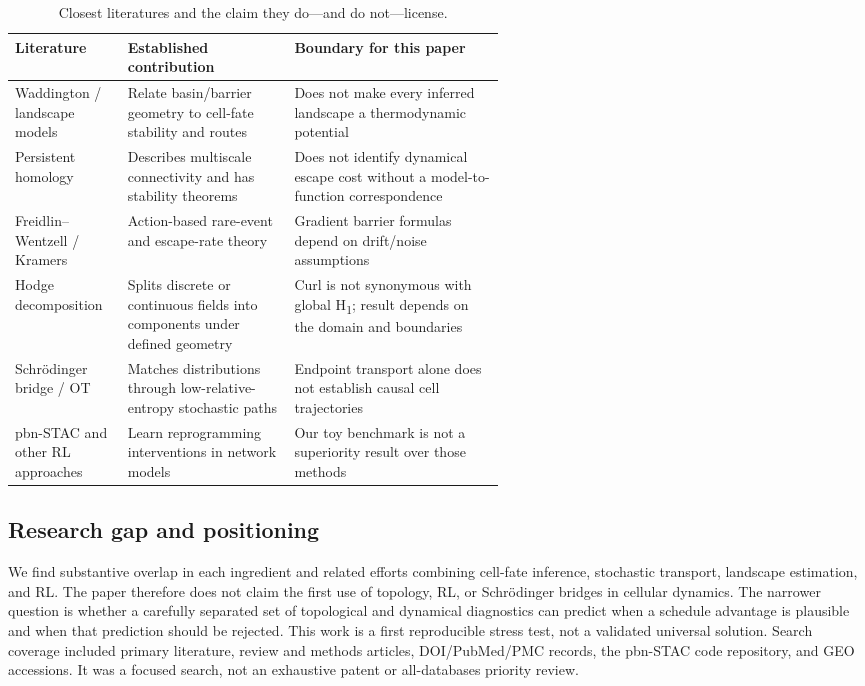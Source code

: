 \documentclass[11pt]{article}
\newcommand{\1}{\mathbf{1}}
\begin{document}
\begin{table}[tbp]\centering\small
\caption{Closest literatures and the claim they do—and do not—license.}
\label{tab:related}
\begin{tabularx}{\linewidth}{@{}p{0.23\linewidth}p{0.34\linewidth}X@{}}\toprule
Literature & Established contribution & Boundary for this paper \\\midrule
Waddington / landscape models & Relate basin/barrier geometry to cell-fate stability and routes & Does not make every inferred landscape a thermodynamic potential \\
Persistent homology & Describes multiscale connectivity and has stability theorems & Does not identify dynamical escape cost without a model-to-function correspondence \\
Freidlin--Wentzell / Kramers & Action-based rare-event and escape-rate theory & Gradient barrier formulas depend on drift/noise assumptions \\
Hodge decomposition & Splits discrete or continuous fields into components under defined geometry & Curl is not synonymous with global H\textsubscript{1}; result depends on the domain and boundaries \\
Schrödinger bridge / OT & Matches distributions through low-relative-entropy stochastic paths & Endpoint transport alone does not establish causal cell trajectories \\
pbn-STAC and other RL approaches & Learn reprogramming interventions in network models & Our toy benchmark is not a superiority result over those methods \\
\bottomrule\end{tabularx}
\end{table}

\subsection{Research gap and positioning}
We find substantive overlap in each ingredient and related efforts combining cell-fate inference, stochastic transport, landscape estimation, and RL. The paper therefore does not claim the first use of topology, RL, or Schrödinger bridges in cellular dynamics. The narrower question is whether a carefully separated set of topological and dynamical diagnostics can predict when a schedule advantage is plausible and when that prediction should be rejected. This work is a first reproducible stress test, not a validated universal solution. Search coverage included primary literature, review and methods articles, DOI/PubMed/PMC records, the pbn-STAC code repository, and GEO accessions. It was a focused search, not an exhaustive patent or all-databases priority review.
\end{document}
